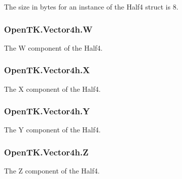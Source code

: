 The size in bytes for an instance of the Half4 struct is 8.

\hypertarget{struct_open_t_k_1_1_vector4h_a6a2fb7b9fd8ad55ad2ba7aca511636fb}{
\subsubsection[{W}]{ Open\-T\-K.\-Vector4h.\-W}}\label{struct_open_t_k_1_1_vector4h_a6a2fb7b9fd8ad55ad2ba7aca511636fb}


The W component of the Half4.

\hypertarget{struct_open_t_k_1_1_vector4h_aa7ae413a8ced899b4a0a6a110fafbbbd}{
\subsubsection[{X}]{ Open\-T\-K.\-Vector4h.\-X}}\label{struct_open_t_k_1_1_vector4h_aa7ae413a8ced899b4a0a6a110fafbbbd}


The X component of the Half4.

\hypertarget{struct_open_t_k_1_1_vector4h_af81d236d00aa897f580cb3a4032ab49a}{
\subsubsection[{Y}]{ Open\-T\-K.\-Vector4h.\-Y}}\label{struct_open_t_k_1_1_vector4h_af81d236d00aa897f580cb3a4032ab49a}


The Y component of the Half4.

\hypertarget{struct_open_t_k_1_1_vector4h_a03730091c433636727986a4e104dfa9a}{
\subsubsection[{Z}]{ Open\-T\-K.\-Vector4h.\-Z}}\label{struct_open_t_k_1_1_vector4h_a03730091c433636727986a4e104dfa9a}


The Z component of the Half4.



